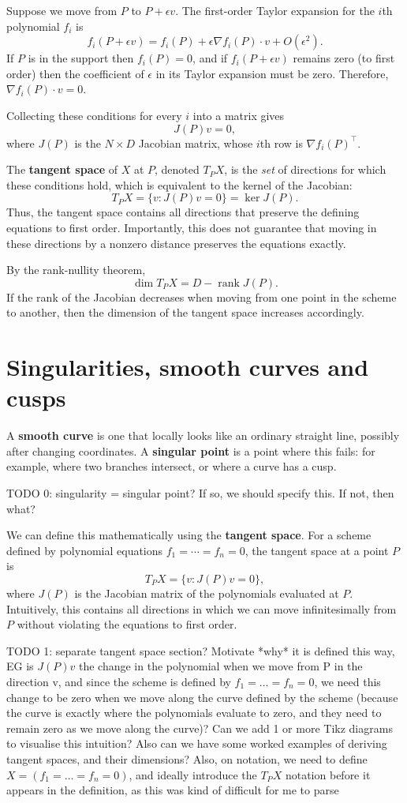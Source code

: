 \documentclass[12pt]{article}
\begin{document}
Suppose we move from $P$ to $P+\epsilon v$. The first-order Taylor expansion for the $i$th polynomial $f_i$ is
\[
f_i(P+\epsilon v)
=f_i(P)+\epsilon\nabla f_i(P)\cdot v+O(\epsilon^2).
\]
If $P$ is in the support then $f_i(P)=0$, and if $f_i(P+\epsilon v)$ remains zero (to first order) then the coefficient of $\epsilon$ in its Taylor expansion must be zero. Therefore, $\nabla f_i(P)\cdot v=0$.

Collecting these conditions for every $i$ into a matrix gives
\[
J(P)v=0,
\]
where $J(P)$ is the $N\times D$ Jacobian matrix,
whose $i$th row is $\nabla f_i(P)^\top$.

The \textbf{tangent space} of $X$ at $P$, denoted
$T_PX$, is the \emph{set} of directions for which these conditions hold, which is equivalent to the kernel of the Jacobian:
\[
\boxed{T_PX=\{v:J(P)v=0\}=\ker J(P).}
\]
Thus, the tangent space contains all directions that
preserve the defining equations to first order.
Importantly, this does not guarantee that moving in
these directions by a nonzero distance preserves the equations exactly.

By the rank-nullity theorem,
\[
\boxed{\dim T_PX=D-\operatorname{rank}J(P).}
\]
If the rank of the Jacobian decreases when moving from one point in the scheme to another, then the dimension of the tangent space increases accordingly.

\newpage
\section{Singularities, smooth curves and cusps}
\label{singularities-smooth-curves-and-cusps}

A \textbf{smooth curve} is one that locally looks like an ordinary
straight line, possibly after changing coordinates. A
\textbf{singular point} is a point where this fails: for example,
where two branches intersect, or where a curve has a cusp.

TODO 0: singularity = singular point? If so, we should specify this. If not, then what?

We can define this mathematically using the \textbf{tangent space}.
For a scheme defined by polynomial equations
$f_1=\cdots=f_n=0$, the tangent space at a point $P$ is
\[
T_PX=\{v:J(P)v=0\},
\]
where $J(P)$ is the Jacobian matrix of the polynomials evaluated
at $P$. Intuitively, this contains all directions in which we
can move infinitesimally from $P$ without violating the equations
to first order.

TODO 1: separate tangent space section? Motivate *why* it is defined this way, EG is $J(P)v$ the change in the polynomial when we move from P in the direction v, and since the scheme is defined by $f_1 = \dots = f_n = 0$, we need this change to be zero when we move along the curve defined by the scheme (because the curve is exactly where the polynomials evaluate to zero, and they need to remain zero as we move along the curve)? Can we add 1 or more Tikz diagrams to visualise this intuition? Also can we have some worked examples of deriving tangent spaces, and their dimensions? Also, on notation, we need to define $X=(f_1=\dots=f_n=0)$, and ideally introduce the $T_PX$ notation before it appears in the definition, as this was kind of difficult for me to parse
\end{document}

